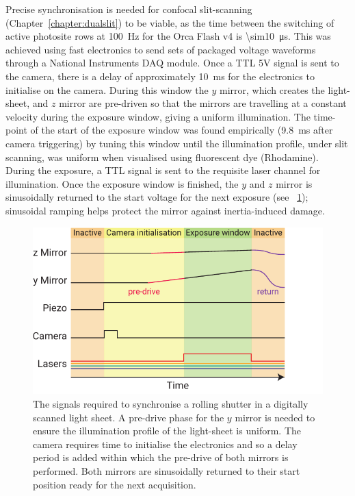 Precise synchronisation is needed for confocal slit-scanning (Chapter~\ref{chapter:dualslit}) to be viable, as the time between the switching of active \gls{photosite} rows at \SI{100}{\hertz} for the Orca Flash v4 is \SI{\sim10}{\micro\second}. %
This was achieved using fast electronics to send sets of packaged voltage waveforms through a National Instruments \gls{DAQ} module.
Once a \gls{TTL} 5V signal is sent to the camera, there is a delay of approximately \SI{10}{\milli\second} for the electronics to initialise on the camera.
During this window the \(y\) mirror, which creates the \gls{light-sheet}, and \(z\) mirror are pre-driven so that the mirrors are travelling at a constant velocity during the exposure window, giving a uniform illumination.
The time-point of the start of the exposure window was found empirically (\SI{9.8}{\milli\second} after camera triggering) by tuning this window until the illumination profile, under slit scanning, was uniform when visualised using fluorescent dye (Rhodamine).
During the exposure, a \gls{TTL} signal is sent to the requisite laser channel for illumination.
Once the exposure window is finished, the \(y\) and \(z\) mirror is sinusoidally returned to the start voltage for the next exposure (see \figurename~\ref{fig:slit_signals}); sinusoidal ramping helps protect the mirror against inertia-induced damage.

\begin{figure}
  \centering
  \includegraphics{slit_signals}
  \caption{The signals required to synchronise a rolling shutter in a digitally scanned light sheet.
  A pre-drive phase for the \(y\) mirror is needed to ensure the illumination profile of the light-sheet is uniform.
  The camera requires time to initialise the electronics and so a delay period is added within which the pre-drive of both mirrors is performed.
  Both mirrors are sinusoidally returned to their start position ready for the next acquisition.
  }\label{fig:slit_signals}
\end{figure}

